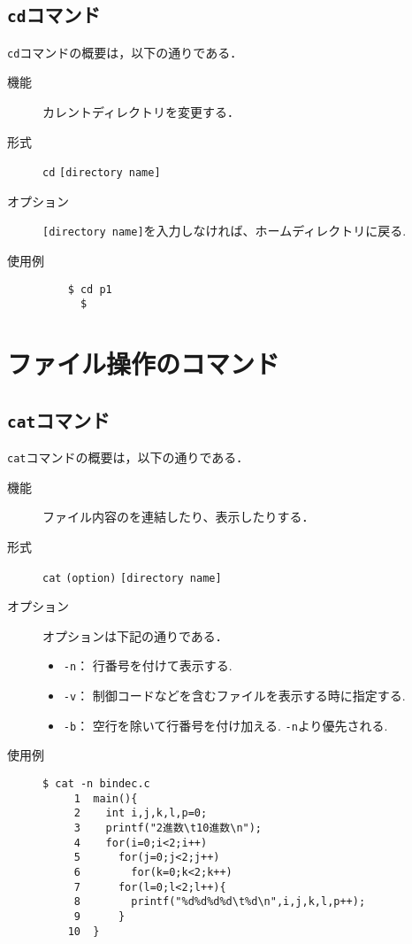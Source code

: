 \documentclass[a4j,11pt]{jarticle}
\begin{document}
\subsection{\texttt{cd}コマンド}
\verb|cd|コマンドの概要は，以下の通りである．
\begin{description}
  \item[機能] %
    カレントディレクトリを変更する．
  \item[形式] %
    \verb|cd| \verb|[directory name]|
  \item[オプション] %
    \verb|[directory name]|を入力しなければ、ホームディレクトリに戻る.
  \item[使用例] %
    \begin{verbatim}
    $ cd p1
      $
    \end{verbatim}
\end{description}
\section{ファイル操作のコマンド}

\subsection{\texttt{cat}コマンド}
\verb|cat|コマンドの概要は，以下の通りである．
\begin{description}
  \item[機能] %
    ファイル内容のを連結したり、表示したりする．
  \item[形式] %
    \verb|cat| \verb|(option)| \verb|[directory name]|
  \item[オプション] %
オプションは下記の通りである．
 \begin{itemize}
      \item \verb|-n|：  行番号を付けて表示する.
      \item \verb|-v|：  制御コードなどを含むファイルを表示する時に指定する.
      \item \verb|-b|：  空行を除いて行番号を付け加える. \verb|-n|より優先される.
    \end{itemize}
  \item[使用例] %
    \begin{verbatim}
$ cat -n bindec.c
     1	main(){
     2	  int i,j,k,l,p=0;
     3	  printf("2進数\t10進数\n");
     4	  for(i=0;i<2;i++)
     5	    for(j=0;j<2;j++)
     6	      for(k=0;k<2;k++)
     7		for(l=0;l<2;l++){
     8		  printf("%d%d%d%d\t%d\n",i,j,k,l,p++);
     9		}
    10	}

    \end{verbatim}
\end{description}
\end{document}

